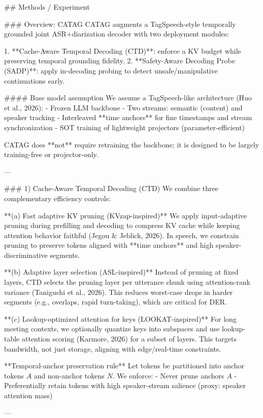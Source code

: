 ## Methods / Experiment  

### Overview: CATAG  
CATAG augments a TagSpeech-style temporally grounded joint ASR+diarization decoder with two deployment modules:

1. **Cache-Aware Temporal Decoding (CTD)**: enforce a KV budget while preserving temporal grounding fidelity.
2. **Safety-Aware Decoding Probe (SADP)**: apply in-decoding probing to detect unsafe/manipulative continuations early.

#### Base model assumption  
We assume a TagSpeech-like architecture (Huo et al., 2026):  
- Frozen LLM backbone  
- Two streams: semantic (content) and speaker tracking  
- Interleaved **time anchors** for fine timestamps and stream synchronization  
- SOT training of lightweight projectors (parameter-efficient)

CATAG does **not** require retraining the backbone; it is designed to be largely training-free or projector-only.

---

### 1) Cache-Aware Temporal Decoding (CTD)  
We combine three complementary efficiency controls:

**(a) Fast adaptive KV pruning (KVzap-inspired)**  
We apply input-adaptive pruning during prefilling and decoding to compress KV cache while keeping attention behavior faithful (Jegou & Jeblick, 2026). In speech, we constrain pruning to preserve tokens aligned with **time anchors** and high speaker-discriminative segments.

**(b) Adaptive layer selection (ASL-inspired)**  
Instead of pruning at fixed layers, CTD selects the pruning layer per utterance chunk using attention-rank variance (Taniguchi et al., 2026). This reduces worst-case drops in harder segments (e.g., overlaps, rapid turn-taking), which are critical for DER.

**(c) Lookup-optimized attention for keys (LOOKAT-inspired)**  
For long meeting contexts, we optionally quantize keys into subspaces and use lookup-table attention scoring (Karmore, 2026) for a subset of layers. This targets bandwidth, not just storage, aligning with edge/real-time constraints.

**Temporal-anchor preservation rule**  
Let tokens be partitioned into anchor tokens \(A\) and non-anchor tokens \(N\). We enforce:
- Never prune anchors \(A\)
- Preferentially retain tokens with high speaker-stream salience (proxy: speaker attention mass)

---

